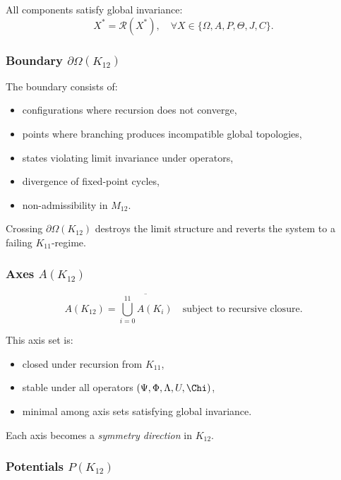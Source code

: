 All components satisfy global invariance:
\[
X^* = \mathcal{R}(X^*),\quad \forall X \in \{\Omega, A, P, \Theta, J, C\}.
\]

\subsubsection{Boundary $\partial\Omega(K_{12})$}

The boundary consists of:
\begin{itemize}
    \item configurations where recursion does not converge,
    \item points where branching produces incompatible global topologies,
    \item states violating limit invariance under operators,
    \item divergence of fixed-point cycles,
    \item non-admissibility in $M_{12}$.
\end{itemize}

Crossing $\partial\Omega(K_{12})$ destroys the limit structure and reverts the
system to a failing $K_{11}$-regime.

\subsubsection{Axes $A(K_{12})$}

\[
A(K_{12}) =
\overline{\bigcup_{i=0}^{11} A(K_i)}
\quad \text{subject to recursive closure}.
\]

This axis set is:
\begin{itemize}
    \item closed under recursion from $K_{11}$,
    \item stable under all operators $(\Psi,\Phi,\Lambda,U,\Chi)$,
    \item minimal among axis sets satisfying global invariance.
\end{itemize}

Each axis becomes a \emph{symmetry direction} in $K_{12}$.

\subsubsection{Potentials $P(K_{12})$}

